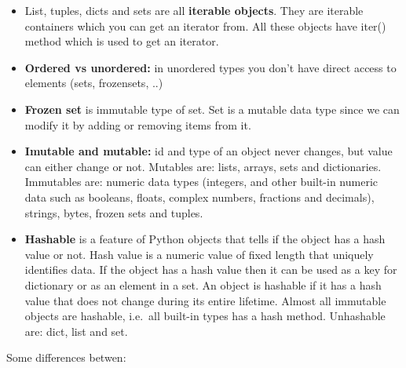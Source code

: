 \documentclass[
  letterpaper,
]{book}
\begin{document}
\begin{itemize}
\item
  List, tuples, dicts and sets are all \textbf{iterable objects}. They
  are iterable containers which you can get an iterator from. All these
  objects have iter() method which is used to get an iterator.
\item
  \textbf{Ordered vs unordered:} in unordered types you don't have
  direct access to elements (sets, frozensets, ..)
\item
  \textbf{Frozen set} is immutable type of set. Set is a mutable data
  type since we can modify it by adding or removing items from it.
\item
  \textbf{Imutable and mutable:} id and type of an object never changes,
  but value can either change or not. Mutables are: lists, arrays, sets
  and dictionaries. Immutables are: numeric data types (integers, and
  other built-in numeric data such as booleans, floats, complex numbers,
  fractions and decimals), strings, bytes, frozen sets and tuples.
\item
  \textbf{Hashable} is a feature of Python objects that tells if the
  object has a hash value or not. Hash value is a numeric value of fixed
  length that uniquely identifies data. If the object has a hash value
  then it can be used as a key for dictionary or as an element in a set.
  An object is hashable if it has a hash value that does not change
  during its entire lifetime. Almost all immutable objects are hashable,
  i.e.~all built-in types has a hash method. Unhashable are: dict, list
  and set.
\end{itemize}

Some differences betwen:
\end{document}
